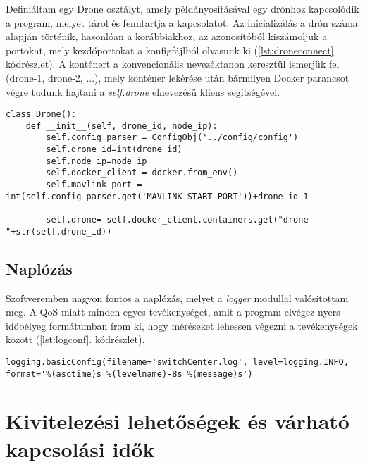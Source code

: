 \noindent
Definiáltam egy Drone osztályt, amely példányosításával egy drónhoz kapcsolódik a program, melyet tárol és fenntartja a kapcsolatot. Az inicializálás a drón száma alapján történik, hasonlóan a korábbiakhoz, az azonosítóból kiszámoljuk a portokat, mely kezdőportokat a konfigfájlból olvasunk ki (\ref{lst:droneconnect}. kódrészlet). A konténert a konvencionális nevezéktanon keresztül ismerjük fel (drone-1, drone-2, ...), mely konténer lekérése után bármilyen Docker parancsot végre tudunk hajtani a \emph{self.drone} elnevezésű kliens segítségével.

\begin{lstlisting}[caption={Drón konténeréhez csatlakozás}, label={lst:droneconnect}]
class Drone():
	def __init__(self, drone_id, node_ip):
		self.config_parser = ConfigObj('../config/config')
		self.drone_id=int(drone_id)
		self.node_ip=node_ip
		self.docker_client = docker.from_env()
		self.mavlink_port = int(self.config_parser.get('MAVLINK_START_PORT'))+drone_id-1

		self.drone= self.docker_client.containers.get("drone-"+str(self.drone_id))
\end{lstlisting}

\subsection{Naplózás}
Szoftveremben nagyon fontos a naplózás, melyet a \emph{logger} modullal valósítottam meg. A QoS miatt minden egyes tevékenységet, amit a program elvégez nyers időbélyeg formátumban írom ki, hogy méréseket lehessen végezni a tevékenységek között (\ref{lst:logconf}. kódrészlet).

\begin{lstlisting}[caption={Naplózás beállítása}, label={lst:logconf}]
logging.basicConfig(filename='switchCenter.log', level=logging.INFO, format='%(asctime)s %(levelname)-8s %(message)s')
\end{lstlisting}

\section{Kivitelezési lehetőségek és várható kapcsolási idők}

